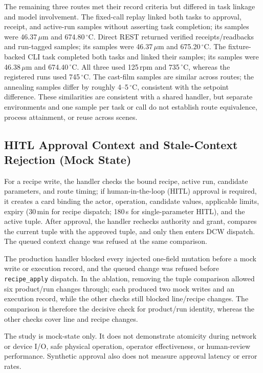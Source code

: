 The remaining three routes met their record criteria but differed in task
linkage and model involvement. The fixed-call replay linked both tasks to
approval, receipt, and active-run samples without asserting task completion;
its samples were 46.37\,$\mu$m and 674.80\,$^{\circ}$C. Direct REST returned
verified receipts/readbacks and run-tagged samples; its samples were
46.37\,$\mu$m and 675.20\,$^{\circ}$C. The fixture-backed CLI task completed
both tasks and linked their samples; its samples were 46.38\,$\mu$m and
674.40\,$^{\circ}$C. All three used 125\,rpm and 735\,$^{\circ}$C, whereas the
registered runs used 745\,$^{\circ}$C. The cast-film samples are similar across
routes; the annealing samples differ by roughly 4--5\,$^{\circ}$C, consistent
with the setpoint difference. These similarities are consistent with a shared
handler, but separate environments and one sample per task or call do not
establish route equivalence, process attainment, or reuse across scenes.

\subsection{HITL Approval Context and Stale-Context Rejection (Mock State)}
\label{sec:guard-results}
For a recipe write, the handler checks the bound recipe, active run, candidate
parameters, and route timing; if human-in-the-loop (HITL) approval is required,
it creates a card binding the actor, operation, candidate values, applicable
limits, expiry (30\,min for recipe dispatch; 180\,s for single-parameter HITL),
and the active tuple. After approval, the handler
rechecks authority and grant, compares the current tuple with the approved
tuple, and only then enters DCW dispatch. The queued context change was
refused at the same comparison.

The production handler blocked every injected one-field mutation before a mock
write or execution record, and the queued change was refused before
\texttt{recipe\_apply} dispatch. In the ablation, removing the tuple comparison
allowed six product/run changes through; each produced two mock writes and an
execution record, while the other checks still blocked line/recipe changes.
The comparison is therefore the decisive check for product/run identity,
whereas the other checks cover line and recipe changes.

The study is mock-state only. It does not demonstrate atomicity during network
or device I/O, safe physical operation, operator effectiveness, or human-review
performance. Synthetic approval also does not measure approval latency or
error rates.

